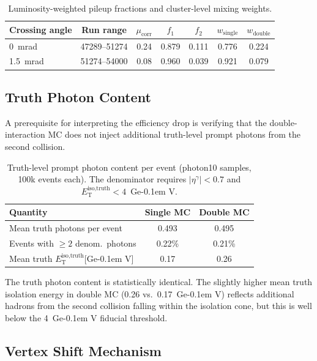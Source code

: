 \documentclass[11pt,a4paper]{article}
\newcommand{\isoETtruth}{\ensuremath{E_\text{T}^\text{iso,truth}}\xspace}
\newcommand{\GeV}{\ifmmode {\mathrm{\ Ge\kern -0.1em V}}\else\textrm{Ge\kern -0.1em V}\fi\xspace}
\begin{document}
\begin{table}[H]
    \centering
    \caption{Luminosity-weighted pileup fractions and cluster-level mixing weights.}
    \label{tab:pileup_fractions}
    \begin{tabular}{lcccccc}
        \toprule
        Crossing angle & Run range & $\mu_{\text{corr}}$ & $f_1$ & $f_2$ & $w_{\text{single}}$ & $w_{\text{double}}$ \\
        \midrule
        0~mrad   & 47289--51274 & 0.24 & 0.879 & 0.111 & 0.776 & 0.224 \\
        1.5~mrad & 51274--54000 & 0.08 & 0.960 & 0.039 & 0.921 & 0.079 \\
        \bottomrule
    \end{tabular}
\end{table}

\subsection{Truth Photon Content}
\label{subsec:truth_content}

A prerequisite for interpreting the efficiency drop is verifying that the
double-interaction MC does not inject additional truth-level prompt photons from
the second collision.

\begin{table}[H]
    \centering
    \caption{Truth-level prompt photon content per event (photon10 samples,
      100k events each). The denominator requires $|\eta^{\gamma}| < 0.7$ and
      $\isoETtruth < 4$~\GeV.}
    \label{tab:truth_content}
    \begin{tabular}{lcc}
        \toprule
        Quantity & Single MC & Double MC \\
        \midrule
        Mean truth photons per event & 0.493 & 0.495 \\
        Events with $\geq 2$ denom.\ photons & 0.22\% & 0.21\% \\
        Mean truth \isoETtruth [\GeV] & 0.17 & 0.26 \\
        \bottomrule
    \end{tabular}
\end{table}

The truth photon content is statistically identical.
The slightly higher mean truth isolation energy in double MC (0.26 vs.\
0.17~\GeV) reflects additional hadrons from the second collision falling within
the isolation cone, but this is well below the 4~\GeV fiducial threshold.

\subsection{Vertex Shift Mechanism}
\label{subsec:vertex_shift}
\end{document}
